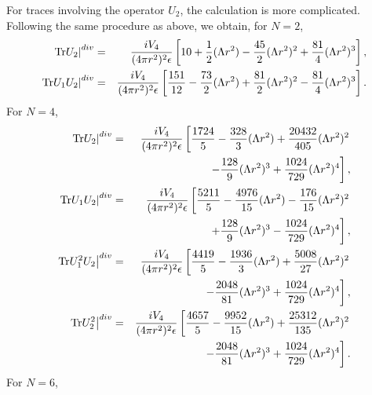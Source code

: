 \documentclass[a4paper,aps,preprint,groupedaddress,showpacs]{revtex4}
\begin{document}
For traces involving the operator $U_{2}$, the calculation is
more complicated. Following the same procedure as above, we obtain,
for $N=2$,
\begin{eqnarray}
\left.{\rm Tr}U_{2}\right\vert^{div}&=&
\frac{iV_{4}}{(4\pi r^{2})^{2}\epsilon}
\left[10+
\frac{1}{2}(\Lambda r^{2})-
\frac{45}{2}(\Lambda r^{2})^{2}+
\frac{81}{4}(\Lambda r^{2})^{3}\right],
\\
\left.{\rm Tr}U_{1}U_{2}\right\vert^{div}&=&
\frac{iV_{4}}{(4\pi r^{2})^{2}\epsilon}
\left[\frac{151}{12}-
\frac{73}{2}(\Lambda r^{2})+
\frac{81}{2}(\Lambda r^{2})^{2}-
\frac{81}{4}(\Lambda r^{2})^{3}\right].
\end{eqnarray}
For $N=4$,
\begin{eqnarray}
\left.{\rm Tr}U_{2}\right\vert^{div}&=&
\frac{iV_{4}}{(4\pi r^{2})^{2}\epsilon}
\left[\frac{1724}{5}-
\frac{328}{3}(\Lambda r^{2})+
\frac{20432}{405}(\Lambda r^{2})^{2}\right.
\nonumber\\
&&\ \ \left.-
\frac{128}{9}(\Lambda r^{2})^{3}+
\frac{1024}{729}(\Lambda r^{2})^{4}\right],
\\
\left.{\rm Tr}U_{1}U_{2}\right\vert^{div}&=&
\frac{iV_{4}}{(4\pi r^{2})^{2}\epsilon}
\left[\frac{5211}{5}-
\frac{4976}{15}(\Lambda r^{2})-
\frac{176}{15}(\Lambda r^{2})^{2}\right.
\nonumber\\
&&\ \ \left.+
\frac{128}{9}(\Lambda r^{2})^{3}-
\frac{1024}{729}(\Lambda r^{2})^{4}\right],
\\
\left.{\rm Tr}U_{1}^{2}U_{2}\right\vert^{div}&=&
\frac{iV_{4}}{(4\pi r^{2})^{2}\epsilon}
\left[\frac{4419}{5}-
\frac{1936}{3}(\Lambda r^{2})+
\frac{5008}{27}(\Lambda r^{2})^{2}\right.
\nonumber\\
&&\ \ \left.-
\frac{2048}{81}(\Lambda r^{2})^{3}+
\frac{1024}{729}(\Lambda r^{2})^{4}\right],
\\
\left.{\rm Tr}U_{2}^{2}\right\vert^{div}&=&
\frac{iV_{4}}{(4\pi r^{2})^{2}\epsilon}
\left[\frac{4657}{5}-
\frac{9952}{15}(\Lambda r^{2})+
\frac{25312}{135}(\Lambda r^{2})^{2}\right.
\nonumber\\
&&\ \ \left.-
\frac{2048}{81}(\Lambda r^{2})^{3}+
\frac{1024}{729}(\Lambda r^{2})^{4}\right].
\end{eqnarray}
For $N=6$,
\end{document}

